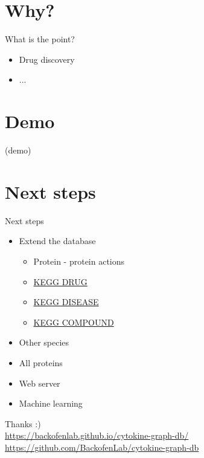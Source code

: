\documentclass{beamer}
\begin{document}
\section{Why?}

\begin{frame}{What is the point?}
\begin{itemize}
    \item Drug discovery
    \item ...
\end{itemize}
\end{frame}

\section{Demo}
\begin{frame}
\centering
\huge{(demo)}
\end{frame}

\section{Next steps}
\begin{frame}{Next steps}
\begin{itemize}
    \item Extend the database
    \begin{itemize}
        \item Protein - protein actions
        \item \href{https://www.genome.jp/kegg/drug/}{KEGG DRUG}
        \item \href{https://www.genome.jp/kegg/disease/}{KEGG DISEASE}
        \item \href{https://www.genome.jp/kegg/compound/}{KEGG COMPOUND}
    \end{itemize}
    \vfill
    \item Other species
    \vfill
    \item All proteins
    \vfill
    \item Web server
    \vfill
    \item Machine learning
\end{itemize}
\end{frame}

\begin{frame}
\centering
\huge{Thanks :)}
\bigskip \\
\small{
    \href{https://backofenlab.github.io/cytokine-graph-db/}{https://backofenlab.github.io/cytokine-graph-db/} \\
    \href{https://github.com/BackofenLab/cytokine-graph-db}{https://github.com/BackofenLab/cytokine-graph-db}
}
\end{frame}
\end{document}
